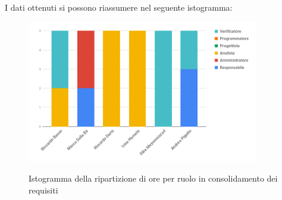 \pagebreak
I dati ottenuti si possono riassumere nel seguente istogramma:
\begin{figure}[H] 
			\centering 
				\includegraphics[width=0.9\textwidth]{res/images/istogramma_consolidamento.png}\\
				\caption{Istogramma della ripartizione di ore per ruolo in consolidamento dei requisiti}
			\label{IstogrammaConsolidamento}
\end{figure}

